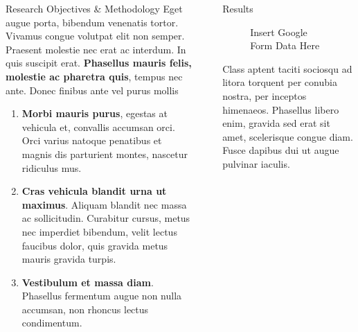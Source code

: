 \documentclass[final]{beamer}
\newlength{\sepwidth}
\newlength{\colwidth}
\newcommand{\separatorcolumn}{\begin{column}{\sepwidth}\end{column}}
\begin{document}
\begin{frame}[t]
\begin{columns}[t]
\begin{column}{\colwidth}
\begin{block}{Research Objectives \& Methodology}
          Eget augue porta, bibendum venenatis tortor. Vivamus 
          congue volutpat elit non semper. Praesent molestie nec erat ac
          interdum. In quis suscipit erat. \textbf{Phasellus mauris felis, molestie
          ac pharetra quis}, tempus nec ante. Donec finibus ante vel purus mollis

          \begin{enumerate}
            \item \textbf{Morbi mauris purus}, egestas at vehicula et, convallis
              accumsan orci. Orci varius natoque penatibus et magnis dis parturient
              montes, nascetur ridiculus mus.
            \item \textbf{Cras vehicula blandit urna ut maximus}. Aliquam blandit nec
              massa ac sollicitudin. Curabitur cursus, metus nec imperdiet bibendum,
              velit lectus faucibus dolor, quis gravida metus mauris gravida turpis.
            \item \textbf{Vestibulum et massa diam}. Phasellus fermentum augue non
              nulla accumsan, non rhoncus lectus condimentum.
          \end{enumerate}
        \end{block}

      \end{column}

      \separatorcolumn

      \begin{column}{\colwidth}

        \begin{block}{Results}

          \begin{figure}
            \centering
            \caption{Insert Google Form Data Here}
          \end{figure}
          
          Class aptent taciti sociosqu ad litora torquent per conubia nostra, per
          inceptos himenaeos. Phasellus libero enim, gravida sed erat sit amet,
          scelerisque congue diam. Fusce dapibus dui ut augue pulvinar iaculis.


\end{block}
\end{column}
\end{columns}
\end{frame}
\end{document}
